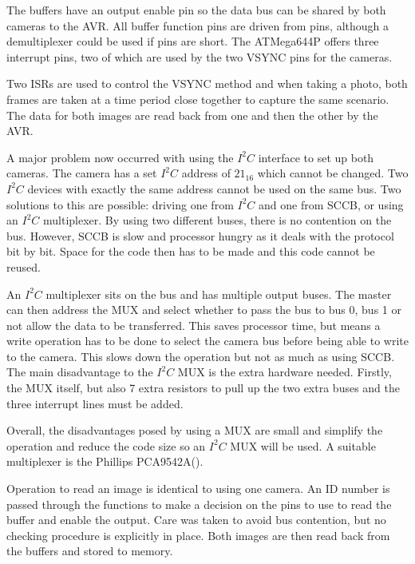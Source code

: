 The buffers have an output enable pin so the data bus can be shared by both cameras to the AVR. All buffer function pins are driven from pins, although a demultiplexer could be used if pins are short. The ATMega644P offers three interrupt pins, two of which are used by the two VSYNC pins for the cameras.

Two ISRs are used to control the VSYNC method and when taking a photo, both frames are taken at a time period close together to capture the same scenario. The data for both images are read back from one and then the other by the AVR. 

A major problem now occurred with using the $I^{2}C$ interface to set up both cameras. The camera has a set $I^{2}C$ address of $21_{16}$ which cannot be changed. Two $I^{2}C$ devices with exactly the same address cannot be used on the same bus. 
Two solutions to this are possible: driving one from $I^{2}C$ and one from SCCB, or using an $I^{2}C$ multiplexer. By using two different buses, there is no contention on the bus. However, SCCB is slow and processor hungry as it deals with the protocol bit by bit. Space for the code then has to be made and this code cannot be reused. 

An $I^{2}C$ multiplexer sits on the bus and has multiple output buses. The master can then address the MUX and select whether to pass the bus to bus 0, bus 1 or not allow the data to be transferred. This saves processor time, but means a write operation has to be done to select the camera bus before being able to write to the camera. This slows down the operation but not as much as using SCCB. The main disadvantage to the $I^{2}C$ MUX is the extra hardware needed. Firstly, the MUX itself, but also 7 extra resistors to pull up the two extra buses and the three interrupt lines must be added. 

Overall, the disadvantages posed by using a MUX are small and simplify the operation and reduce the code size so an $I^{2}C$ MUX will be used. A suitable multiplexer is the Phillips PCA9542A(\cite{I2C_Mux}).

Operation to read an image is identical to using one camera. An ID number is passed through the functions to make a decision on the pins to use to read the buffer and enable the output. Care was taken to avoid bus contention, but no checking procedure is explicitly in place. Both images are then read back from the buffers and stored to memory. 

